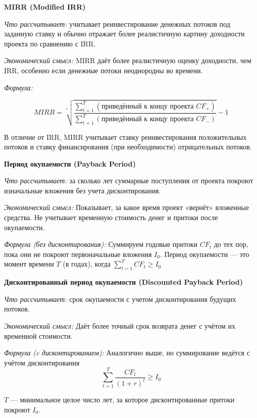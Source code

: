 \textbf{MIRR (Modified IRR)}

\textit{Что рассчитывает:} учитывает реинвестирование денежных потоков под заданную ставку и обычно отражает более реалистичную картину доходности проекта по сравнению с IRR.

\textit{Экономический смысл:} MIRR даёт более реалистичную оценку доходности, чем IRR, особенно если денежные потоки неоднородны во времени.

\textit{Формула:}

\begin{equation}
    MIRR = \sqrt[r]{\frac{\sum \limits ^T _{t=1} \left( \text{приведённый к концу проекта }CF_+ \right)}{\sum \limits ^T _{t=1} \left( \text{приведённый к концу проекта }CF_- \right)}} - 1
\end{equation}

В отличие от IRR, MIRR учитывает ставку реинвестирования положительных потоков и ставку финансирования (при необходимости) отрицательных потоков.


\textbf{Период окупаемости (Payback Period)}

\textit{Что рассчитывает:} за сколько лет суммарные поступления от проекта покроют изначальные вложения без учета дисконтирования.

\textit{Экономический смысл:} Показывает, за какое время проект «вернёт» вложенные средства. Не учитывает временную стоимость денег и притоки после окупаемости.

\textit{Формула (без дисконтирования):}
Суммируем годовые притоки $CF_t$ до тех пор, пока они не покроют первоначальные вложения $I_0$.
Период окупаемости --- это момент времени $T$ (в годах), когда $\sum \limits ^T _{t=1} CF_t \geq I_0$

\textbf{Дисконтированный период окупаемости (Discounted Payback Period)}

\textit{Что рассчитывает:} срок окупаемости с учетом дисконтирования будущих потоков.

\textit{Экономический смысл:} Даёт более точный срок возврата денег с учётом их временной стоимости.

\textit{Формула (c дисконтированием):}
Аналогично выше, но суммирование ведётся с учётом дисконтирования
\begin{equation}
    \sum \limits_{t=1} ^T \frac{CF_t}{(1+r)^t} \geq I_0
\end{equation}

$T$ --- минимальное целое число лет, за которое дисконтированные притоки покроют $I_0$.



